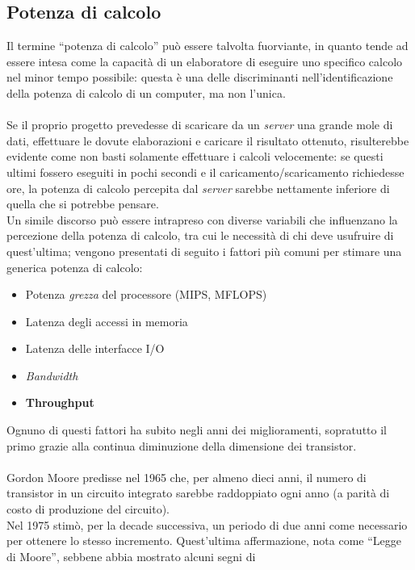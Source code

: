 \subsection{Potenza di calcolo}
Il termine ``potenza di calcolo'' può essere talvolta fuorviante, in quanto
tende ad essere intesa come la capacità di un elaboratore di eseguire uno
specifico calcolo nel minor tempo possibile: questa è una delle discriminanti
nell'identificazione della potenza di calcolo di un computer, ma non l'unica. 
\\ \\
Se il proprio progetto prevedesse di scaricare da un \emph{server} una grande
mole di dati, effettuare le dovute elaborazioni e caricare il risultato 
ottenuto, risulterebbe evidente come non basti solamente effettuare i calcoli
velocemente: se questi ultimi fossero eseguiti in pochi secondi e il
caricamento/scaricamento richiedesse ore, la potenza di calcolo percepita
dal \emph{server} sarebbe nettamente inferiore di quella che si potrebbe
pensare. \\
Un simile discorso può essere intrapreso con diverse variabili che influenzano
la percezione della potenza di calcolo, tra cui le necessità di chi deve
usufruire di quest'ultima; vengono presentati di seguito i fattori più
comuni per stimare una generica potenza di calcolo:
\newpage
\begin{itemize}
\item Potenza \emph{grezza} del processore (MIPS, MFLOPS)
\item Latenza degli accessi in memoria
\item Latenza delle interfacce I/O
\item \textit{Bandwidth}
\item \textbf{Throughput}
\end{itemize}
Ognuno di questi fattori ha subito negli anni dei miglioramenti, sopratutto il
primo grazie alla continua diminuzione della dimensione dei transistor. 
\\ \\
Gordon Moore predisse nel 1965\citep{GMoore} che, 
per almeno dieci anni, il numero di transistor in un circuito integrato 
sarebbe raddoppiato ogni anno (a parità di costo di produzione del circuito). \\
Nel 1975 stimò, per la decade successiva, un periodo di due anni come 
necessario per ottenere lo stesso incremento. Quest'ultima affermazione, 
nota come ``Legge di Moore'', sebbene abbia mostrato alcuni segni di
